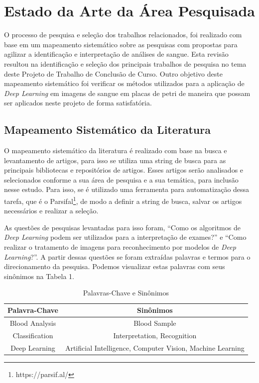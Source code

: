 \chapter{Estado da Arte da Área Pesquisada}
\label{chap:mapeamento}

O processo de pesquisa e seleção dos trabalhos relacionados, foi realizado com base em um mapeamento sistemático sobre as pesquisas com propostas para agilizar a identificação e interpretação de análises de sangue. Esta revisão resultou na identificação e seleção dos principais trabalhos de pesquisa no tema deste Projeto de Trabalho de Conclusão de Curso. Outro objetivo deste mapeamento sistemático foi verificar os métodos utilizados para a aplicação de \emph{Deep Learning} em imagens de sangue em placas de petri de maneira que possam ser aplicados neste projeto de forma satisfatória.

\section{Mapeamento Sistemático da Literatura}

O mapeamento sistemático da literatura é realizado com base na busca e levantamento de artigos, para isso se utiliza uma string de busca para as principais bibliotecas e repositórios de artigos. Esses artigos serão analisados e selecionados conforme a sua área de pesquisa e a sua temática, para inclusão nesse estudo. Para isso, se é utilizado uma ferramenta para automatização dessa tarefa, que é o Parsifal\footnote[1]{https://parsif.al/}, de modo a definir a string de busca, salvar os artigos necessários e realizar a seleção.

As questões de pesquisas levantadas para isso foram, ``Como os algoritmos de \emph{Deep Learning} podem ser utilizados para a interpretação de exames?'' e ``Como realizar o tratamento de imagens para reconhecimento por modelos de \emph{Deep Learning}?''. A partir dessas questões se foram extraídas palavras e termos para o direcionamento da pesquisa. Podemos visualizar estas palavras com seus sinônimos na Tabela 1.

\begin{table}[!htb]
	\centering
	\caption{Palavras-Chave e Sinônimos}
	\label{tbl:palavrasChave}
	\begin{tabular}{|c|c|}
		\hline
		\textbf{Palavra-Chave} & \textbf{Sinônimos}                                        \\ \hline
		Blood Analysis         & Blood Sample                                               \\ \hline
		Classification         & Interpretation, Recognition                                \\ \hline
		Deep Learning          & Artificial Intelligence, Computer Vision, Machine Learning \\ \hline
	\end{tabular}
	\vspace{6pt}
\end{table}

